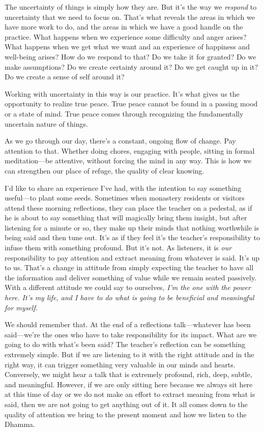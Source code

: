 The uncertainty of things is simply how they are. But it's the way we 
\emph{respond} to uncertainty that we need to focus on. That's what 
reveals the areas in which we have more work to do, and the areas in 
which we have a good handle on the practice. What happens when we 
experience some difficulty and anger arises? What happens when we get 
what we want and an experience of happiness and well-being arises? How 
do we respond to that? Do we take it for granted? Do we make 
assumptions? Do we create certainty around it? Do we get caught up in 
it? Do we create a sense of self around it?

Working with uncertainty in this way is our practice. It's what gives 
us the opportunity to realize true peace. True peace cannot be found in 
a passing mood or a state of mind. True peace comes through recognizing 
the fundamentally uncertain nature of things.

As we go through our day, there's a constant, ongoing flow of change. 
Pay attention to that. Whether doing chores, engaging with people, 
sitting in formal meditation---be attentive, without forcing the mind 
in any way. This is how we can strengthen our place of refuge, the 
quality of clear knowing.


I'd like to share an experience I've had, with the intention to say 
something useful---to plant some seeds. Sometimes when monastery 
residents or visitors attend these morning reflections, they can place 
the teacher on a pedestal, as if he is about to say something that will 
magically bring them insight, but after listening for a minute or so, 
they make up their minds that nothing worthwhile is being said and then 
tune out. It's as if they feel it's the teacher's responsibility to 
infuse them with something profound. But it's not. As listeners, it is 
\emph{our} responsibility to pay attention and extract meaning from 
whatever is said. It's up to us. That's a change in attitude from 
simply expecting the teacher to have all the information and deliver 
something of value while we remain seated passively. With a different 
attitude we could say to ourselves, \emph{I'm the one with the power 
here. It's my life, and I have to do what is going to be beneficial and 
meaningful for myself.}

We should remember that. At the end of a reflections talk---whatever 
has been said---we're the ones who have to take responsibility for its 
impact. What are we going to do with what's been said? The teacher's 
reflection can be something extremely simple. But if we are listening 
to it with the right attitude and in the right way, it can trigger 
something very valuable in our minds and hearts. Conversely, we might 
hear a talk that is extremely profound, rich, deep, subtle, and 
meaningful. However, if we are only sitting here because we always sit 
here at this time of day or we do not make an effort to extract meaning 
from what is said, then we are not going to get anything out of it. It 
all comes down to the quality of attention we bring to the present 
moment and how we listen to the Dhamma.

